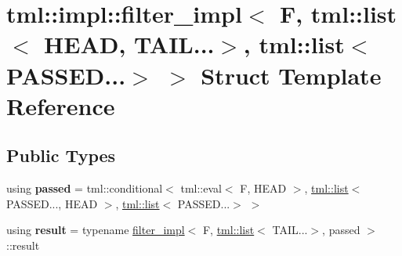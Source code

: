 \hypertarget{structtml_1_1impl_1_1filter__impl_3_01_f_00_01tml_1_1list_3_01_h_e_a_d_00_01_t_a_i_l_8_8_8_4_00_2cef1b8cad91f1e60a92123e788c2419}{\section{tml\+:\+:impl\+:\+:filter\+\_\+impl$<$ F, tml\+:\+:list$<$ H\+E\+A\+D, T\+A\+I\+L...$>$, tml\+:\+:list$<$ P\+A\+S\+S\+E\+D...$>$ $>$ Struct Template Reference}
\label{structtml_1_1impl_1_1filter__impl_3_01_f_00_01tml_1_1list_3_01_h_e_a_d_00_01_t_a_i_l_8_8_8_4_00_2cef1b8cad91f1e60a92123e788c2419}
}
\subsection*{Public Types}
\begin{DoxyCompactItemize}
\item 
\hypertarget{structtml_1_1impl_1_1filter__impl_3_01_f_00_01tml_1_1list_3_01_h_e_a_d_00_01_t_a_i_l_8_8_8_4_00_2cef1b8cad91f1e60a92123e788c2419_a9c106079fda8c1d5d90fde353e199f42}{using {\bfseries passed} = tml\+::conditional$<$ tml\+::eval$<$ F, H\+E\+A\+D $>$, \hyperlink{structtml_1_1list}{tml\+::list}$<$ P\+A\+S\+S\+E\+D..., H\+E\+A\+D $>$, \hyperlink{structtml_1_1list}{tml\+::list}$<$ P\+A\+S\+S\+E\+D...$>$ $>$}\label{structtml_1_1impl_1_1filter__impl_3_01_f_00_01tml_1_1list_3_01_h_e_a_d_00_01_t_a_i_l_8_8_8_4_00_2cef1b8cad91f1e60a92123e788c2419_a9c106079fda8c1d5d90fde353e199f42}

\item 
\hypertarget{structtml_1_1impl_1_1filter__impl_3_01_f_00_01tml_1_1list_3_01_h_e_a_d_00_01_t_a_i_l_8_8_8_4_00_2cef1b8cad91f1e60a92123e788c2419_ac28a903833ff4d075ece0af42f390426}{using {\bfseries result} = typename \hyperlink{structtml_1_1impl_1_1filter__impl}{filter\+\_\+impl}$<$ F, \hyperlink{structtml_1_1list}{tml\+::list}$<$ T\+A\+I\+L...$>$, passed $>$\+::result}\label{structtml_1_1impl_1_1filter__impl_3_01_f_00_01tml_1_1list_3_01_h_e_a_d_00_01_t_a_i_l_8_8_8_4_00_2cef1b8cad91f1e60a92123e788c2419_ac28a903833ff4d075ece0af42f390426}

\end{DoxyCompactItemize}
